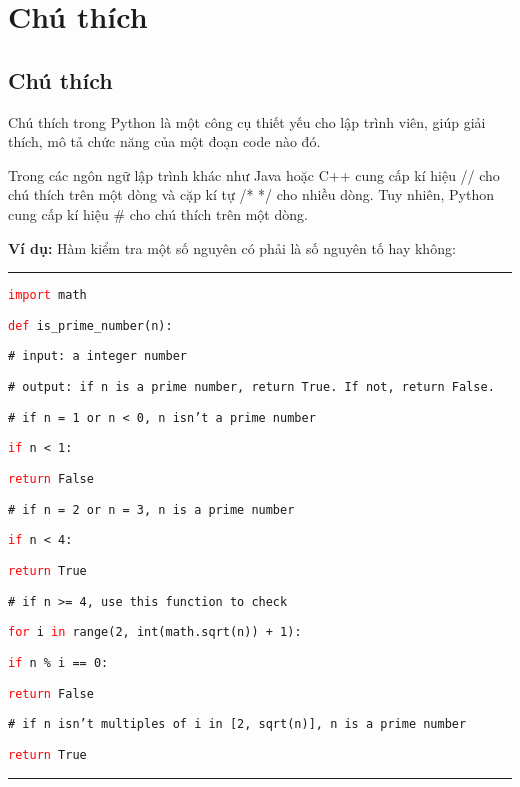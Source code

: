 \section{Chú thích}
\subsection{Chú thích}
Chú thích trong Python là một công cụ thiết yếu cho lập trình viên, giúp giải thích, mô tả chức năng của một đoạn code nào đó.\par
Trong các ngôn ngữ lập trình khác như Java hoặc C++ cung cấp kí hiệu // cho chú thích trên một dòng và cặp kí tự /* */ cho nhiều dòng. Tuy nhiên, Python cung cấp kí hiệu \# cho chú thích trên một dòng.\par
\textbf{Ví dụ:} Hàm kiểm tra một số nguyên có phải là số nguyên tố hay không:\\
\rule{\linewidth}{0.2mm}\par
\begin{linenumbers}
	\texttt{\textcolor{red}{import} math}\par
	\smallskip
	\texttt{\textcolor{red}{def} is\_prime\_number(n):}\par
	\qquad\texttt{\# input: a integer number}\par
	\qquad\texttt{\# output: if n is a prime number, return True. If not, return False.}\par
	\smallskip
	\qquad\texttt{\# if n = 1 or n < 0, n isn't a prime number}\par
	\qquad\texttt{\textcolor{red}{if} n < 1:}\par
	\qquad\qquad\texttt{\textcolor{red}{return} False}\par
	\qquad\texttt{\# if n = 2 or n = 3, n is a prime number}\par
	\qquad\texttt{\textcolor{red}{if} n < 4:}\par
	\qquad\qquad\texttt{\textcolor{red}{return} True}\par
	\qquad\texttt{\# if n >= 4, use this function to check}\par
	\qquad\texttt{\textcolor{red}{for} i \textcolor{red}{in} range(2, int(math.sqrt(n)) + 1):}\par
	\qquad\qquad\texttt{\textcolor{red}{if} n \% i == 0:}\par
	\qquad\qquad\qquad\texttt{\textcolor{red}{return} False}\par
	\qquad\texttt{\# if n isn't multiples of i in [2, sqrt(n)], n is a prime number}\par	
	\qquad\texttt{\textcolor{red}{return} True}
\end{linenumbers}
\rule{\linewidth}{0.2mm}\par
\noindent
\resetlinenumber
\newpage
